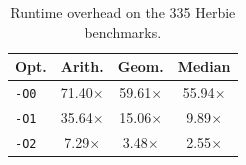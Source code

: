 \begin{table}
  \caption{Runtime overhead on the 335 Herbie benchmarks.}
  \label{tab:herbie_overhead}
  \centering
  \begin{tabular}{lccc}
    \toprule
    Opt. & Arith. & Geom. & Median\\
    \midrule
    \texttt{-O0} & 71.40$\times$ & 59.61$\times$ & 55.94$\times$ \\
    \texttt{-O1} & 35.64$\times$ & 15.06$\times$ & 9.89$\times$ \\
    \texttt{-O2} & 7.29$\times$ & 3.48$\times$ & 2.55$\times$ \\
  \bottomrule
\end{tabular}
\end{table}